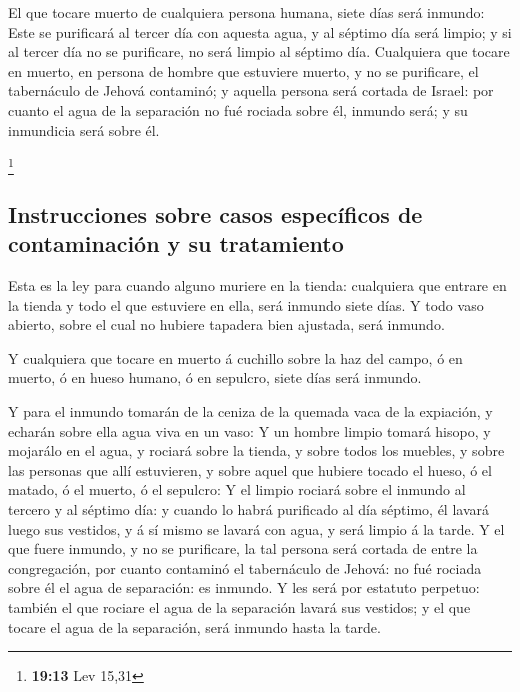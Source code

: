  El que tocare muerto de cualquiera persona humana, siete
días será inmundo:  Este se purificará al tercer día con
aquesta agua, y al séptimo día será limpio; y si al tercer día no se
purificare, no será limpio al séptimo día.  Cualquiera
que tocare en muerto, en persona de hombre que estuviere muerto, y no se
purificare, el tabernáculo de Jehová contaminó; y aquella persona será
cortada de Israel: por cuanto el agua de la separación no fué rociada
sobre él, inmundo será; y su inmundicia será sobre él.

\footnote{\textbf{19:13} Lev 15,31}

\hypertarget{instrucciones-sobre-casos-especuxedficos-de-contaminaciuxf3n-y-su-tratamiento}{%
\subsection{Instrucciones sobre casos específicos de contaminación y su
tratamiento}\label{instrucciones-sobre-casos-especuxedficos-de-contaminaciuxf3n-y-su-tratamiento}}

 Esta es la ley para cuando alguno muriere en la tienda:
cualquiera que entrare en la tienda y todo el que estuviere en ella,
será inmundo siete días.  Y todo vaso abierto, sobre el
cual no hubiere tapadera bien ajustada, será inmundo.

 Y cualquiera que tocare en muerto á cuchillo sobre la
haz del campo, ó en muerto, ó en hueso humano, ó en sepulcro, siete días
será inmundo.

 Y para el inmundo tomarán de la ceniza de la quemada
vaca de la expiación, y echarán sobre ella agua viva en un vaso:
 Y un hombre limpio tomará hisopo, y mojarálo en el agua,
y rociará sobre la tienda, y sobre todos los muebles, y sobre las
personas que allí estuvieren, y sobre aquel que hubiere tocado el hueso,
ó el matado, ó el muerto, ó el sepulcro:  Y el limpio
rociará sobre el inmundo al tercero y al séptimo día: y cuando lo habrá
purificado al día séptimo, él lavará luego sus vestidos, y á sí mismo se
lavará con agua, y será limpio á la tarde.  Y el que
fuere inmundo, y no se purificare, la tal persona será cortada de entre
la congregación, por cuanto contaminó el tabernáculo de Jehová: no fué
rociada sobre él el agua de separación: es inmundo.  Y
les será por estatuto perpetuo: también el que rociare el agua de la
separación lavará sus vestidos; y el que tocare el agua de la
separación, será inmundo hasta la tarde.

